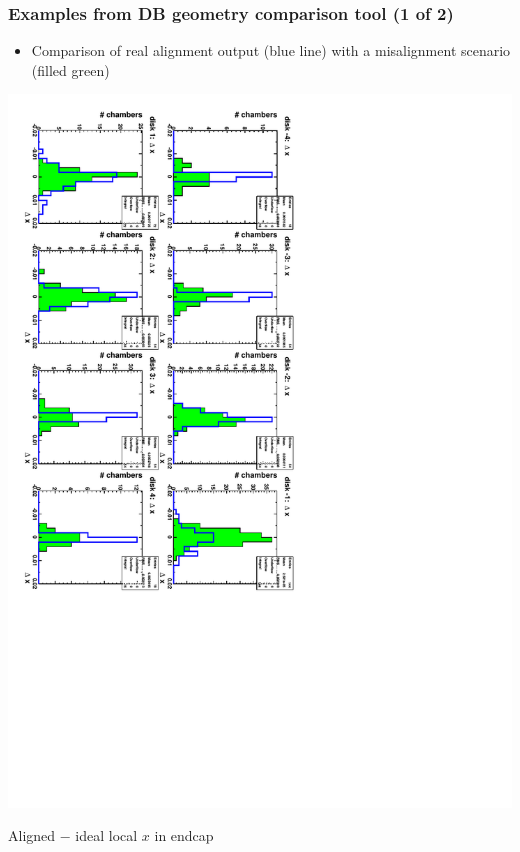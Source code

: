 \documentclass[compress]{beamer}
\begin{document}
\begin{frame}
\frametitle{Examples from DB geometry comparison tool (1 of 2)}
\begin{itemize}
\item Comparison of real alignment output (blue line) with a misalignment scenario (filled green)
\end{itemize}
\begin{center}
\includegraphics[height=0.9\linewidth, angle=90]{c_endcap_dxloc_overlay.pdf}

Aligned $-$ ideal local $x$ in endcap
\end{center}
\end{frame}
\end{document}
